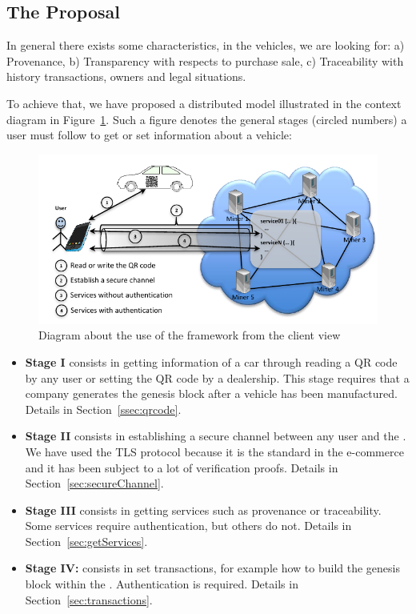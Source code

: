 \subsection{The Proposal}
\label{subsec:proposal}
In general there exists some characteristics, in the vehicles, we are looking for:
a) Provenance,
b) Transparency with respects to purchase sale,
c) Traceability with history transactions, owners and legal situations.

To achieve that, we have proposed a distributed model illustrated in the context
diagram in Figure~\ref{fig:flowChartFramework}. Such a figure denotes
the general stages (circled numbers) a user must follow to get or set information about a 
vehicle:
\begin{figure}[bt]
  \centering
    \includegraphics[scale=0.75]{images/gralScheme.pdf}
        \caption{Diagram about the use of the framework from the client view}
    \label{fig:flowChartFramework}
\end{figure}

\begin{itemize}
  \item \textbf{Stage I} consists in getting information of a car through reading
    a QR code by any user or setting the QR code by a dealership. This stage requires 
    that a company generates the genesis block after a vehicle has been manufactured. 
    Details in Section~\ref{ssec:qrcode}.
  \item \textbf{Stage II} consists in establishing a secure channel between any user
    and the \blockchaincarnetwork. We
    have used the TLS protocol because it is the standard in the
    e-commerce and it has been subject to a lot of verification proofs.
    Details in Section~\ref{sec:secureChannel}.
  \item \textbf{Stage III} consists in getting services such as provenance or 
    traceability. Some services require authentication, but others do not.
    Details in Section~\ref{sec:getServices}.  
  \item \textbf{Stage IV:} consists in set transactions, for example how to build
    the genesis block within the  \blockchaincarnetwork. Authentication is required. 
    Details in Section~\ref{sec:transactions}. 
\end{itemize}


